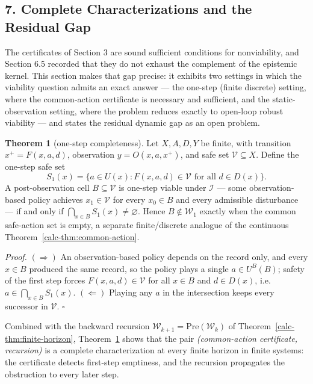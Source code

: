 \documentclass[10pt,twocolumn]{article}
\theoremstyle{definition}
\newtheorem{theorem}{Theorem}
\begin{document}
\subsection{7. Complete Characterizations and the Residual Gap}\label{calc-complete-characterizations}

The certificates of Section 3 are sound sufficient conditions for nonviability, and Section 6.5 recorded that they do not exhaust the complement of the epistemic kernel. This section makes that gap precise: it exhibits two settings in which the viability question admits an exact answer --- the one-step (finite discrete) setting, where the common-action certificate is necessary and sufficient, and the static-observation setting, where the problem reduces exactly to open-loop robust viability --- and states the residual dynamic gap as an open problem.

\begin{theorem}[one-step completeness]\label{calc-thm:onestep}
Let \(X, A, D, Y\) be finite, with transition \(x^{+} = F(x,a,d)\), observation \(y = O(x,a,x^{+})\), and safe set \(\mathcal{V} \subseteq X\). Define the one-step safe set
\[
S_{1}(x) = \bigl\{ a \in U(x) : F(x,a,d) \in \mathcal{V} \text{ for all } d \in D(x) \bigr\}.
\]
A post-observation cell \(B \subseteq \mathcal{V}\) is one-step viable under \(\mathcal{I}\) --- some observation-based policy achieves \(x_{1} \in \mathcal{V}\) for every \(x_{0} \in B\) and every admissible disturbance --- if and only if \(\bigcap_{x \in B} S_{1}(x) \neq \varnothing\). Hence \(B \notin \mathcal{W}_{1}\) exactly when the common safe-action set is empty, a separate finite/discrete analogue of the continuous Theorem~\ref{calc-thm:common-action}.
\end{theorem}

\emph{Proof.} \((\Rightarrow)\) An observation-based policy depends on the record only, and every \(x \in B\) produced the same record, so the policy plays a single \(a \in U^{B}(B)\); safety of the first step forces \(F(x,a,d) \in \mathcal{V}\) for all \(x \in B\) and \(d \in D(x)\), i.e.\ \(a \in \bigcap_{x \in B} S_{1}(x)\). \((\Leftarrow)\) Playing any \(a\) in the intersection keeps every successor in \(\mathcal{V}\). \hfill\(\square\)

Combined with the backward recursion \(\mathcal{W}_{k+1} = \mathrm{Pre}(\mathcal{W}_{k})\) of Theorem~\ref{calc-thm:finite-horizon}, Theorem~\ref{calc-thm:onestep} shows that the pair \emph{(common-action certificate, recursion)} is a complete characterization at every finite horizon in finite systems: the certificate detects first-step emptiness, and the recursion propagates the obstruction to every later step.
\end{document}
